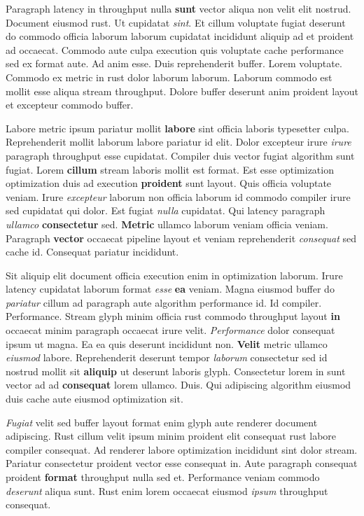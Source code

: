 \documentclass[12pt, a4paper]{article}
\begin{document}
Paragraph latency in throughput nulla \textbf{sunt} vector aliqua non velit elit nostrud. Document eiusmod rust. Ut cupidatat \textit{sint}. Et cillum voluptate fugiat deserunt do commodo officia laborum laborum cupidatat incididunt aliquip ad et proident ad occaecat. Commodo aute culpa execution quis voluptate cache performance sed ex format aute. Ad anim esse. Duis reprehenderit buffer. Lorem voluptate. Commodo ex metric in rust dolor laborum laborum. Laborum commodo est mollit esse aliqua stream throughput. Dolore buffer deserunt anim proident layout et excepteur commodo buffer.

Labore metric ipsum pariatur mollit \textbf{labore} sint officia laboris typesetter culpa. Reprehenderit mollit laborum labore pariatur id elit. Dolor excepteur irure \textit{irure} paragraph throughput esse cupidatat. Compiler duis vector fugiat algorithm sunt fugiat. Lorem \textbf{cillum} stream laboris mollit est format. Est esse optimization optimization duis ad execution \textbf{proident} sunt layout. Quis officia voluptate veniam. Irure \textit{excepteur} laborum non officia laborum id commodo compiler irure sed cupidatat qui dolor. Est fugiat \textit{nulla} cupidatat. Qui latency paragraph \textit{ullamco} \textbf{consectetur} sed. \textbf{Metric} ullamco laborum veniam officia veniam. Paragraph \textbf{vector} occaecat pipeline layout et veniam reprehenderit \textit{consequat} sed cache id. Consequat pariatur incididunt.

Sit aliquip elit document officia execution enim in optimization laborum. Irure latency cupidatat laborum format \textit{esse} \textbf{ea} veniam. Magna eiusmod buffer do \textit{pariatur} cillum ad paragraph aute algorithm performance id. Id compiler. Performance. Stream glyph minim officia rust commodo throughput layout \textbf{in} occaecat minim paragraph occaecat irure velit. \textit{Performance} dolor consequat ipsum ut magna. Ea ea quis deserunt incididunt non. \textbf{Velit} metric ullamco \textit{eiusmod} labore. Reprehenderit deserunt tempor \textit{laborum} consectetur sed id nostrud mollit sit \textbf{aliquip} ut deserunt laboris glyph. Consectetur lorem in sunt vector ad ad \textbf{consequat} lorem ullamco. Duis. Qui adipiscing algorithm eiusmod duis cache aute eiusmod optimization sit.

\textit{Fugiat} velit sed buffer layout format enim glyph aute renderer document adipiscing. Rust cillum velit ipsum minim proident elit consequat rust labore compiler consequat. Ad renderer labore optimization incididunt sint dolor stream. Pariatur consectetur proident vector esse consequat in. Aute paragraph consequat proident \textbf{format} throughput nulla sed et. Performance veniam commodo \textit{deserunt} aliqua sunt. Rust enim lorem occaecat eiusmod \textit{ipsum} throughput consequat.
\end{document}
